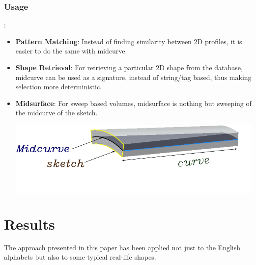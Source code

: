 \subsubsection{Usage}
:
\begin{itemize}
\item \textbf{Pattern Matching}: Instead of finding similarity between 2D profiles, it is easier to do the same with midcurve.

\item \textbf{Shape Retrieval}: For retrieving a particular 2D shape from the database, midcurve can be used as a signature, instead of string/tag based, thus making selection more deterministic.

\item \textbf{Midsurface}: For sweep based volumes, midsurface is nothing but  sweeping of the midcurve of the sketch.




\includegraphics[width=0.65\linewidth]{..//Common/images/MidsurfSmallProfile.pdf}

\end{itemize}


\section{Results}

The approach presented in this paper has been applied not just to the English alphabets but also to some typical real-life shapes. %

